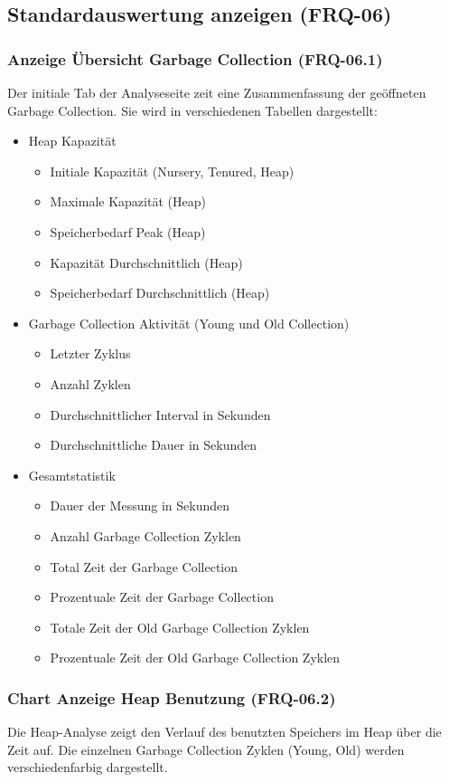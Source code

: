 \subsection{Standardauswertung anzeigen (FRQ-06)}
\subsubsection{Anzeige Übersicht Garbage Collection (FRQ-06.1)}\label{standardreport}
Der initiale Tab der Analyseseite zeit eine Zusammenfassung der geöffneten Garbage Collection. Sie wird in verschiedenen Tabellen dargestellt:
\begin{itemize}
	\item Heap Kapazität
	\begin{itemize}
		\item Initiale Kapazität (Nursery, Tenured, Heap)
		\item Maximale Kapazität (Heap)
		\item Speicherbedarf Peak (Heap)
		\item Kapazität Durchschnittlich (Heap)
		\item Speicherbedarf Durchschnittlich (Heap)
	\end{itemize}
	\item Garbage Collection Aktivität (Young und Old Collection)
	\begin{itemize}
		\item Letzter Zyklus
		\item Anzahl Zyklen
		\item Durchschnittlicher Interval in Sekunden
		\item Durchschnittliche Dauer in Sekunden		
	\end{itemize}	
	\item Gesamtstatistik
	\begin{itemize}
		\item Dauer der Messung in Sekunden
		\item Anzahl Garbage Collection Zyklen
		\item Total Zeit der Garbage Collection
		\item Prozentuale Zeit der Garbage Collection
		\item Totale Zeit der Old Garbage Collection Zyklen
		\item Prozentuale Zeit der Old Garbage Collection Zyklen
	\end{itemize}
\end{itemize}

\subsubsection{Chart Anzeige Heap Benutzung (FRQ-06.2)}
Die Heap-Analyse zeigt den Verlauf des benutzten Speichers im Heap über die Zeit auf. Die einzelnen Garbage Collection Zyklen (Young, Old) werden verschiedenfarbig dargestellt.

